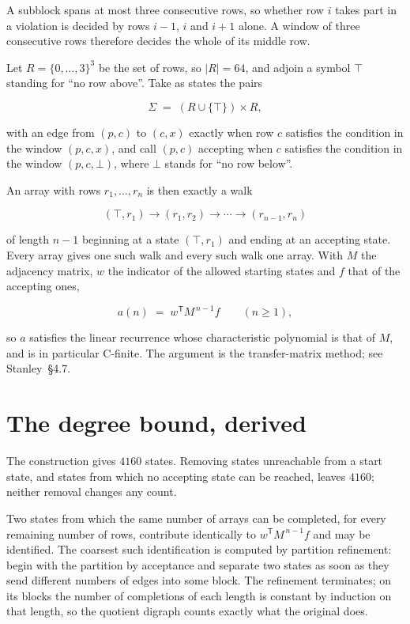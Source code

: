 \documentclass[11pt]{article}
\theoremstyle{definition}
\begin{document}
A subblock spans at most three consecutive rows, so whether row $i$ takes part in a violation is decided by rows $i-1$, $i$ and $i+1$ alone. A window of three consecutive rows therefore decides the whole of its middle row.

Let $R = \{0,\dots,3\}^{3}$ be the set of rows, so $|R| = 64$, and adjoin a symbol $\top$ standing for ``no row above''. Take as states the pairs

\[\Sigma \;=\; (R \cup \{\top\}) \times R,\]

with an edge from $(p,c)$ to $(c,x)$ exactly when row $c$ satisfies the condition in the window $(p,c,x)$, and call $(p,c)$ accepting when $c$ satisfies the condition in the window $(p,c,\bot)$, where $\bot$ stands for ``no row below''.

An array with rows $r_1,\dots,r_n$ is then exactly a walk

\[(\top,r_1) \to (r_1,r_2) \to \cdots \to (r_{n-1},r_n)\]

of length $n-1$ beginning at a state $(\top,r_1)$ and ending at an accepting state. Every array gives one such walk and every such walk one array. With $M$ the adjacency matrix, $w$ the indicator of the allowed starting states and $f$ that of the accepting ones,

\[a(n) \;=\; w^{\mathsf T} M^{\,n-1} f \qquad (n \ge 1),\]

so $a$ satisfies the linear recurrence whose characteristic polynomial is that of $M$, and is in particular C-finite. The argument is the transfer-matrix method; see Stanley~\S4.7.

\section{The degree bound, derived}

The construction gives $4160$ states. Removing states unreachable from a start state, and states from which no accepting state can be reached, leaves $4160$; neither removal changes any count.

Two states from which the same number of arrays can be completed, for every remaining number of rows, contribute identically to $w^{\mathsf T}M^{\,n-1}f$ and may be identified. The coarsest such identification is computed by partition refinement: begin with the partition by acceptance and separate two states as soon as they send different numbers of edges into some block. The refinement terminates; on its blocks the number of completions of each length is constant by induction on that length, so the quotient digraph counts exactly what the original does.
\end{document}

